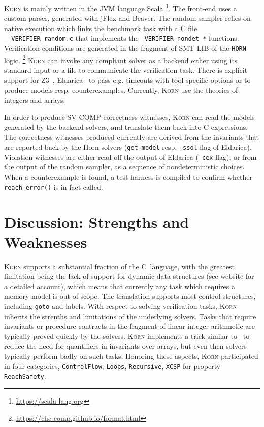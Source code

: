 \documentclass{llncs}
\newcommand{\Korn}{\textsc{Korn}\xspace}
\begin{document}
\Korn is mainly written in the JVM language Scala
    \footnote{\url{https://scala-lang.org}}.
The front-end uses a custom parser, generated with jFlex and Beaver.
The random sampler relies on native execution which links
the benchmark task with a C file \verb!__VERIFIER_random.c!
that implements the \verb!_VERIFIER_nondet_*! functions.
Verification conditions are generated in the fragment of SMT-LIB of the \texttt{HORN} logic.%
    \footnote{\url{https://chc-comp.github.io/format.html}}
\Korn can invoke any compliant solver as a backend either using its standard input or a file to communicate the verification task.
There is explicit support for Z3~\cite{gurfinkel2019science}, Eldarica~\cite{hojjat2018eldarica}%
to pass e.g. timeouts with tool-specific options or to produce models resp. counterexamples.
Currently, \Korn use the theories of integers and arrays.

In order to produce SV-COMP correctness witnesses, \Korn can read the models generated by the backend-solvers, and translate them back into C expressions.
The correctness witnesses produced currently are derived from
the invariants that are reported back by the Horn solvers (\texttt{get-model} resp. \texttt{-ssol} flag of Eldarica).
Violation witnesses are either read off the output of Eldarica (\texttt{-cex} flag),
or from the output of the random sampler, as a sequence of nondeterministic choices.
When a counterexample is found, a test harness is compiled to confirm whether \texttt{reach\_error()} is in fact called.

\section{Discussion: Strengths and Weaknesses}
\label{sec:discussion}

\Korn supports a substantial fraction of the C~language, with the greatest limitation
being the lack of support for dynamic data structures (see website for a detailed account),
which means that currently any task which requires a memory model is out of scope.
The translation supports most control structures, including \texttt{goto} and labels.
With respect to solving verification tasks,
\Korn inherits the strenths and limitations of the underlying solvers.
Tasks that require invariants or procedure contracts in the fragment of linear integer arithmetic
are typically proved quickly by the solvers.
\Korn implements a trick similar to~\cite{monniaux2016cell}
to reduce the need for quantifiers in invariants over arrays,
but even then solvers typically perform badly on such tasks.
Honoring these aspects, \Korn participated in four categories,
\texttt{ControlFlow},
\texttt{Loops},
\texttt{Recursive},
\texttt{XCSP}
for property \texttt{ReachSafety}.
\end{document}
